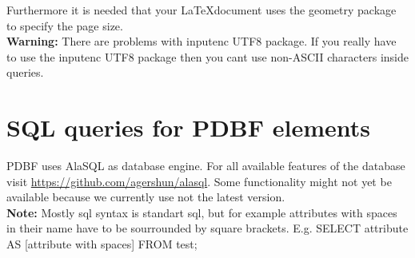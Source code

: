 \documentclass[11pt]{scrartcl}
\begin{document}
\noindent Furthermore it is needed that your \LaTeX\relax document uses the geometry package to specify the page size.\\

\noindent \textbf{Warning:} There are problems with inputenc UTF8 package. If you really have to use the inputenc UTF8 package then you cant use non-ASCII characters inside queries.

\section{SQL queries for PDBF elements}
PDBF uses AlaSQL as database engine. For all available features of the database visit \url{https://github.com/agershun/alasql}. Some functionality might not yet be available because we currently use not the latest version.\\[4pt]
\textbf{Note:} Mostly sql syntax is standart sql, but for example attributes with spaces in their name have to be sourrounded by square brackets. E.g. SELECT attribute AS [attribute with spaces] FROM test;\\
\end{document}
